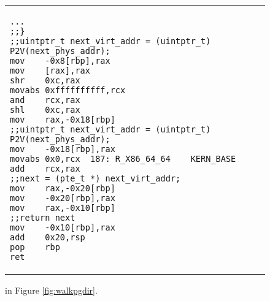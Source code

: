 \begin{figure*}[ht]
\begin{tabular}{p{}p{}}
\begin{lstlisting}[mathescape,basicstyle=\scriptsize\ttfamily]
...
;;}
;;uintptr_t next_virt_addr = (uintptr_t) P2V(next_phys_addr);
mov    -0x8[rbp],rax
mov    [rax],rax
shr    0xc,rax
movabs 0xffffffffff,rcx
and    rcx,rax
shl    0xc,rax
mov    rax,-0x18[rbp]
;;uintptr_t next_virt_addr = (uintptr_t) P2V(next_phys_addr);
mov    -0x18[rbp],rax
movabs 0x0,rcx	187: R_X86_64_64	KERN_BASE
add    rcx,rax
;;next = (pte_t *) next_virt_addr;
mov    rax,-0x20[rbp]
mov    -0x20[rbp],rax
mov    rax,-0x10[rbp]
;;return next
mov    -0x10[rbp],rax
add    0x20,rsp
pop    rbp
ret
  \end{lstlisting}
  \end{tabular}
\vspace{-1em}
\caption{ in Figure \ref{fig:walkpgdir}.}
\label{fig:getnexttable}
\end{figure*}

\subsubsection{}



